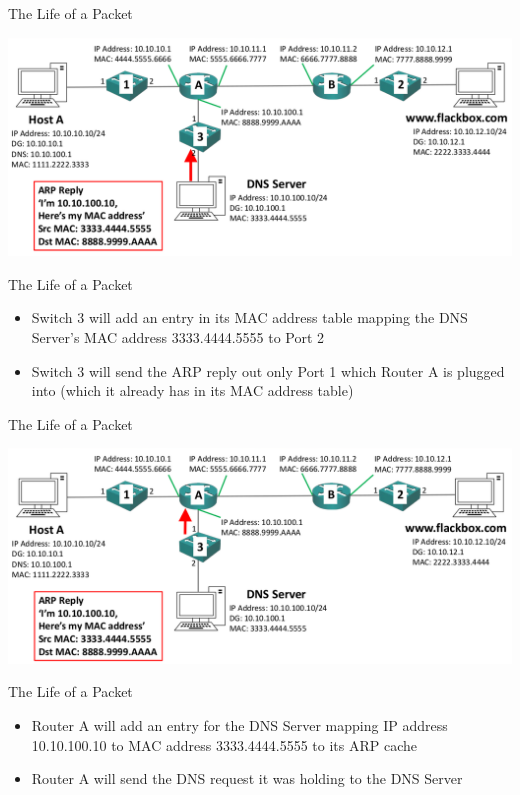 \documentclass[pdflatex,compress,mathserif]{beamer}
\begin{document}
\begin{frame}{The Life of a Packet}
	\begin{center}
		\includegraphics[width=\linewidth]{img/img25}
	\end{center}
\end{frame}

\begin{frame}{The Life of a Packet}
	\begin{itemize}
		\item Switch 3 will add an entry in its MAC address table mapping the DNS Server’s MAC address 3333.4444.5555 to Port 2
		\item Switch 3 will send the ARP reply out only Port 1 which Router A is plugged into (which it already has in its MAC address table)
	\end{itemize}
\end{frame}

\begin{frame}{The Life of a Packet}
	\begin{center}
		\includegraphics[width=\linewidth]{img/img26}
	\end{center}
\end{frame}

\begin{frame}{The Life of a Packet}
	\begin{itemize}
		\item Router A will add an entry for the DNS Server mapping IP address 10.10.100.10 to MAC address 3333.4444.5555 to its ARP cache
		\item Router A will send the DNS request it was holding to the DNS Server
	\end{itemize}
\end{frame}
\end{document}
